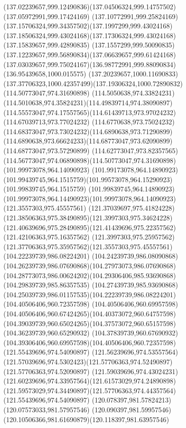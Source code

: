 {{\curveto(137.02239657,999.12490836)(137.04506324,999.14757502)(137.05972991,999.17424169)
\curveto(137.10772991,999.25824169)(137.15706324,999.34357502)(137.1997299,999.43024168)
\curveto(137.18506324,999.43024168)(137.17306324,999.43024168)(137.15839657,999.42890835)
\curveto(137.1557299,999.50090835)(137.12239657,999.56890834)(137.06639657,999.61424168)
\curveto(137.03039657,999.75024167)(136.98772991,999.88090834)(136.95439658,1000.015575)
\curveto(137.20239657,1000.11690833)(137.37706323,1000.42357499)(137.19306324,1000.72890832)
\moveto(114.50773047,974.31690898)
\curveto(114.5050638,974.33824231)(114.5010638,974.35824231)(114.49839714,974.38090897)
\curveto(114.55573047,974.17557565)(114.61439713,973.97024232)(114.67039713,973.77024232)
\curveto(114.6770638,973.75024232)(114.68373047,973.73024232)(114.6890638,973.71290899)
\curveto(114.6890638,973.66624233)(114.68773047,973.62090899)(114.68773047,973.57290899)
\curveto(114.62773047,973.82357565)(114.56773047,974.06890898)(114.50773047,974.31690898)
\moveto(101.99973078,964.14090923)
\lineto(101.99173078,964.14890923)
\curveto(101.99439745,964.1515759)(101.99573078,964.15290923)(101.99839745,964.1515759)
\curveto(101.99839745,964.14890923)(101.99973078,964.14490923)(101.99973078,964.14090923)
\moveto(121.3557303,975.45557561)
\curveto(121.37039697,975.41824228)(121.38506363,975.38490895)(121.3997303,975.34624228)
\curveto(121.40639696,975.28490895)(121.41439696,975.22357562)(121.42106363,975.16357562)
\curveto(121.3997303,975.25957562)(121.37706363,975.35957562)(121.3557303,975.45557561)
\moveto(104.22239739,986.08224201)
\curveto(104.24239739,986.08090868)(104.26239739,986.07690868)(104.27973073,986.07690868)
\curveto(104.28773073,986.00624202)(104.29306406,985.93690868)(104.29839739,985.86357535)
\curveto(104.27439739,985.93690868)(104.25039739,986.01157535)(104.22239739,986.08224201)
\moveto(104.40506406,960.72357598)
\curveto(104.40506406,960.69957598)(104.40506406,960.67424265)(104.40373072,960.64757598)
\curveto(104.39039739,960.65024265)(104.37573072,960.65157598)(104.36239739,960.65290932)
\curveto(104.37839739,960.67690932)(104.39306406,960.69957598)(104.40506406,960.72357598)
\moveto(121.55439696,974.54090897)
\curveto(121.56239696,974.53557564)(121.57039696,974.5302423)(121.57706363,974.52490897)
\lineto(121.57706363,974.52090897)
\curveto(121.59039696,974.43024231)(121.60239696,974.33957564)(121.61573029,974.24890898)
\curveto(121.59573029,974.34490897)(121.57706363,974.44357564)(121.55439696,974.54090897)
\moveto(120.078397,981.57824213)
\lineto(120.07573033,981.57957546)
\curveto(120.090397,981.59957546)(120.10506366,981.61690879)(120.118397,981.63957546)
}}
